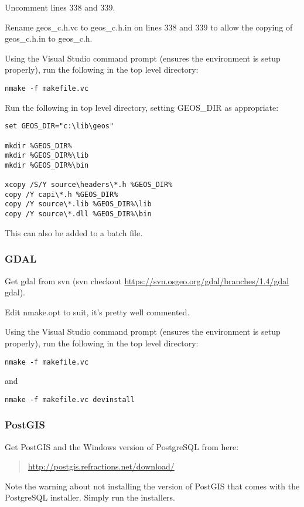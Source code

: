 Uncomment lines 338 and 339.

Rename geos\_c.h.vc to geos\_c.h.in on lines 338 and 339 to allow the copying of geos\_c.h.in to geos\_c.h.

Using the Visual Studio command prompt (ensures the environment is setup properly), run the following in the top level directory:

\begin{verbatim}
nmake -f makefile.vc 
\end{verbatim}

Run the following in top level directory, setting GEOS\_DIR as appropriate:

\begin{verbatim}
set GEOS_DIR="c:\lib\geos"

mkdir %GEOS_DIR%
mkdir %GEOS_DIR%\lib
mkdir %GEOS_DIR%\bin

xcopy /S/Y source\headers\*.h %GEOS_DIR%
copy /Y capi\*.h %GEOS_DIR%
copy /Y source\*.lib %GEOS_DIR%\lib
copy /Y source\*.dll %GEOS_DIR%\bin
\end{verbatim}

This can also be added to a batch file.

\subsubsection{GDAL}
Get gdal from svn (svn checkout \url{https://svn.osgeo.org/gdal/branches/1.4/gdal} gdal).

Edit nmake.opt to suit, it's pretty well commented.

Using the Visual Studio command prompt (ensures the environment is setup properly), run the following in the top level directory:

\begin{verbatim}
nmake -f makefile.vc 
\end{verbatim}

and

\begin{verbatim}
nmake -f makefile.vc devinstall 
\end{verbatim}

\subsubsection{PostGIS}
Get PostGIS and the Windows version of PostgreSQL from here:

	\begin{quotation}
\url{http://postgis.refractions.net/download/}
	\end{quotation}
Note the warning about not installing the version of PostGIS that comes with the PostgreSQL installer. Simply run the installers.

